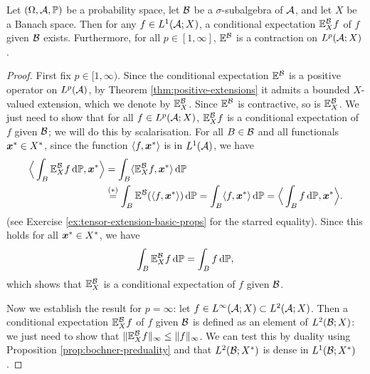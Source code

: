 \begin{prop}
  Let $(\Omega,\mathcal{A},\mathbb{P})$ be a probability space, let $\mathcal{B}$ be a $\sigma$-subalgebra of $\mathcal{A}$, and let $X$ be a Banach space.
  Then for any $f \in L^1(\mathcal{A};X)$, a conditional expectation $\mathbb{E}_X^{\mathcal{B}}f$ of $f$ given $\mathcal{B}$ exists.
  Furthermore, for all $p \in [1,\infty]$, $\mathbb{E}^{\mathcal{B}}$ is a contraction on $L^p(\mathcal{A};X)$.
\end{prop}


\begin{proof}  
  First fix $p \in [1,\infty)$.
  Since the conditional expectation $\mathbb{E}^{\mathcal{B}}$ is a positive operator on $L^p(\mathcal{A})$, by Theorem \ref{thm:positive-extensions} it admits a bounded $X$-valued extension, which we denote by $\mathbb{E}_X^{\mathcal{B}}$.
  Since $\mathbb{E}^{\mathcal{B}}$ is contractive, so is $\mathbb{E}_X^{\mathcal{B}}$.
  We just need to show that for all $f \in L^p(\mathcal{A};X)$, $\mathbb{E}_X^{\mathcal{B}}f$ is a conditional expectation of $f$ given $\mathcal{B}$; we will do this by scalarisation.
  For all $B \in \mathcal{B}$ and all functionals $\bm{x}^* \in X^*$, since the function $\langle f, \bm{x}^* \rangle$ is in $L^1(\mathcal{A})$, we have
  \begin{equation*}
    \begin{aligned}
      \Big\langle \int_B \mathbb{E}_X^{\mathcal{B}} f \, \mathrm{d}\mathbb{P}, \bm{x}^* \Big\rangle
      &= \int_B \langle \mathbb{E}_X^{\mathcal{B}} f, \bm{x}^* \rangle \, \mathrm{d}\mathbb{P} \\
      &\stackrel{(*)}{=} \int_B \mathbb{E}^{\mathcal{B}} (\langle f, \bm{x}^* \rangle) \, \mathrm{d}\mathbb{P}
      = \int_B \langle f, \bm{x}^* \rangle \, \mathrm{d}\mathbb{P}
      = \Big\langle \int_B f \, \mathrm{d}\mathbb{P}, \bm{x}^* \Big\rangle.
    \end{aligned}
  \end{equation*}
  (see Exercise \ref{ex:tensor-extension-basic-props} for the starred equality).
  Since this holds for all $\bm{x}^* \in X^*$, we have
  \begin{equation*}
     \int_B \mathbb{E}_X^{\mathcal{B}} f \, \mathrm{d}\mathbb{P} = \int_B f \, \mathrm{d}\mathbb{P},
   \end{equation*}
   which shows that $\mathbb{E}_X^{\mathcal{B}}$ is a conditional expectation of $f$ given $\mathcal{B}$.

   Now we establish the result for $p = \infty$: let $f \in L^\infty(\mathcal{A};X) \subset L^2(\mathcal{A};X)$.
   Then a conditional expectation $\mathbb{E}_X^{\mathcal{B}} f$ of $f$ given $\mathcal{B}$ is defined as an element of $L^2(\mathcal{B};X)$: we just need to show that $\|\mathbb{E}_X^{\mathcal{B}} f\|_\infty \leq \|f\|_\infty$.
   We can test this by duality using Proposition \ref{prop:bochner-preduality} and that $L^2(\mathcal{B}; X^*)$ is dense in $L^1( \mathcal{B}; X^*)$.
   

\end{proof}
